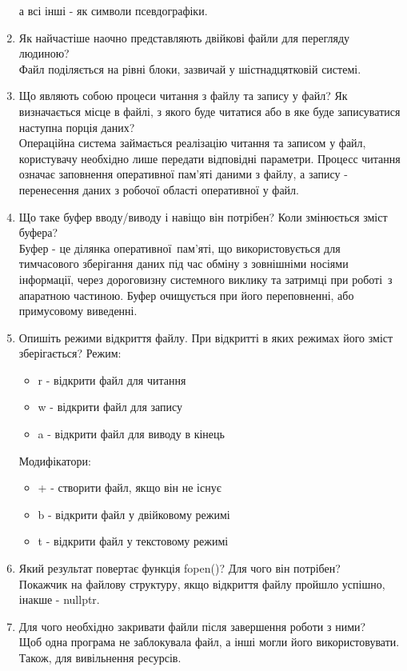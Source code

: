 \begin{enumerate}
          а всі інші - як символи псевдографіки.
    \item Як найчастіше наочно представляють двійкові файли для перегляду людиною? \\
          Файл поділяється на рівні блоки, зазвичай у шістнадцятковій системі.
    \item Що являють собою процеси читання з файлу та запису у файл?
          Як визначається місце в файлі, з якого буде читатися або
          в яке буде записуватися наступна порція даних? \\
          Операційна система займається реалізацію читання та записом у файл,
          користувачу необхідно лише передати відповідні параметри.
          Процесс читання означає заповнення оперативної пам'яті даними з файлу,
          а запису - перенесення даних з робочої області оперативної у файл.
    \item Що таке буфер вводу/виводу і навіщо він потрібен?
          Коли змінюється зміст буфера? \\
          Буфер - це ділянка оперативної пам'яті, що використовується для тимчасового зберігання
          даних під час обміну з зовнішніми носіями інформації, через дороговизну системного виклику
          та затримці при роботі з апаратною частиною.
          Буфер очищується при його переповненні, або примусовому виведенні.
    \item Опишіть режими відкриття файлу. При відкритті в яких режимах його зміст зберігається?
          Режим:
          \begin{itemize}
              \item r - відкрити файл для читання
              \item w - відкрити файл для запису
              \item a - відкрити файл для виводу в кінець
          \end{itemize}
          Модифікатори:
          \begin{itemize}
              \item + - створити файл, якщо він не існує
              \item b - відкрити файл у двійковому режимі
              \item t - відкрити файл у текстовому режимі
          \end{itemize}
    \item Який результат повертає функція fopen()? Для чого він потрібен? \\
          Покажчик на файлову структуру, якщо відкриття файлу пройшло успішно,
          інакше - nullptr.
    \item Для чого необхідно закривати файли після завершення роботи з ними? \\
          Щоб одна програма не заблокувала файл, а інші могли його використовувати.
          Також, для вивільнення ресурсів.
\end{enumerate}
